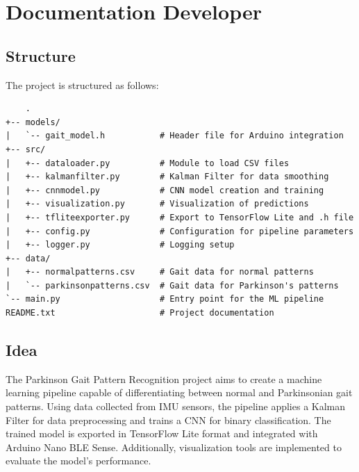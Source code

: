%
%
%
\chapter{Documentation Developer}
\section{Structure}



The project is structured as follows:

\begin{verbatim}
	.
+-- models/
|   `-- gait_model.h           # Header file for Arduino integration
+-- src/
|   +-- dataloader.py          # Module to load CSV files
|   +-- kalmanfilter.py        # Kalman Filter for data smoothing
|   +-- cnnmodel.py            # CNN model creation and training
|   +-- visualization.py       # Visualization of predictions
|   +-- tfliteexporter.py      # Export to TensorFlow Lite and .h file
|   +-- config.py              # Configuration for pipeline parameters
|   +-- logger.py              # Logging setup
+-- data/
|   +-- normalpatterns.csv     # Gait data for normal patterns
|   `-- parkinsonpatterns.csv  # Gait data for Parkinson's patterns
`-- main.py                    # Entry point for the ML pipeline
README.txt                     # Project documentation
\end{verbatim}

\section{Idea}

The Parkinson Gait Pattern Recognition project aims to create a machine learning pipeline capable of differentiating between normal and Parkinsonian gait patterns. Using data collected from IMU sensors, the pipeline applies a Kalman Filter for data preprocessing and trains a CNN for binary classification. The trained model is exported in TensorFlow Lite format and integrated with Arduino Nano BLE Sense. Additionally, visualization tools are implemented to evaluate the model’s performance.

